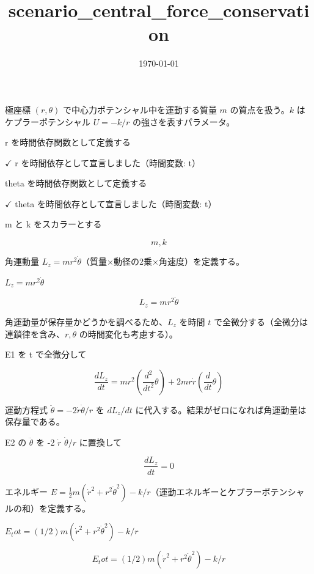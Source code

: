 \documentclass[dvipdfmx,a4paper,11pt]{jsarticle}
\title{scenario\_central\_force\_conservation}
\date{\today}
\begin{document}
\maketitle

極座標 $(r,\theta)$ で中心力ポテンシャル中を運動する質量 $m$ の質点を扱う。$k$ はケプラーポテンシャル $U=-k/r$ の強さを表すパラメータ。

r を時間依存関数として定義する

$\checkmark$ r を時間依存として宣言しました（時間変数: t）

theta を時間依存関数として定義する

$\checkmark$ theta を時間依存として宣言しました（時間変数: t）

m と k をスカラーとする

\[
  m, k
\]

角運動量 $L_z=mr^2\dot\theta$（質量$\times$動径の2乗$\times$角速度）を定義する。

$L_z = m r^2 \dot{\theta}$

\begin{equation}
  L_z = m r^2 \dot{\theta}
  \label{eq:E1}
\end{equation}

角運動量が保存量かどうかを調べるため、$L_z$ を時間 $t$ で全微分する（全微分は連鎖律を含み、$r,\theta$ の時間変化も考慮する）。

E1 を t で全微分して

\begin{equation}
  \frac{dL_z}{dt} = m r^2 \left(\frac{d^2}{d t^2} \theta\right)+2 m r \dot{r} \left(\frac{d}{d t} \theta\right)
  \label{eq:E2}
\end{equation}

運動方程式 $\ddot\theta=-2\dot r\dot\theta/r$ を $dL_z/dt$ に代入する。結果がゼロになれば角運動量は保存量である。

E2 の $\ddot{\theta}$ を -2 $\dot{r}$ $\dot{\theta} / r$ に置換して

\begin{equation}
  \frac{dL_z}{dt} = 0
  \label{eq:E3}
\end{equation}

エネルギー $E=\frac12 m(\dot r^2+r^2\dot\theta^2)-k/r$（運動エネルギーとケプラーポテンシャルの和）を定義する。

$E_tot = (1/2) m (\dot{r}^2 + r^2 \dot{\theta}^2) - k / r$

\begin{equation}
  E_tot = (1/2) m (\dot{r}^2 + r^2 \dot{\theta}^2) - k / r
  \label{eq:E4}
\end{equation}
\end{document}

